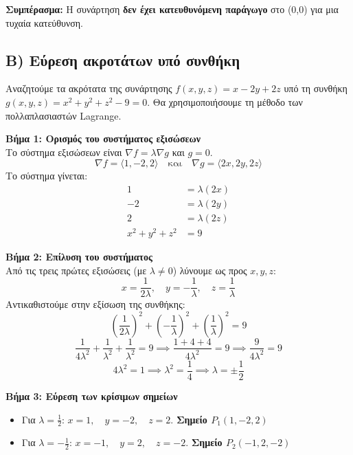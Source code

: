 \documentclass[a4paper,12pt,twoside]{article}
\newcommand{\en}[1]{{\selectlanguage{english}#1\selectlanguage{greek}}}
\begin{document}
\begin{enumerate}[label=\roman*.]
    \noindent
    \textbf{Συμπέρασμα:} Η συνάρτηση \textbf{δεν έχει κατευθυνόμενη παράγωγο} στο (0,0) για μια τυχαία κατεύθυνση.
\end{enumerate}

\hrulefill
\vspace{1em}

\subsection*{B) Εύρεση ακροτάτων υπό συνθήκη}
\noindent
Αναζητούμε τα ακρότατα της συνάρτησης $f(x, y, z) = x - 2y + 2z$ υπό τη συνθήκη $g(x, y, z) = x^2 + y^2 + z^2 - 9 = 0$. Θα χρησιμοποιήσουμε τη μέθοδο των πολλαπλασιαστών \en{Lagrange}.

\noindent
\textbf{Βήμα 1: Ορισμός του συστήματος εξισώσεων}\\
\noindent
Το σύστημα εξισώσεων είναι $\nabla f = \lambda \nabla g$ και $g=0$.
\[
\nabla f = \langle 1, -2, 2 \rangle \quad \text{και} \quad \nabla g = \langle 2x, 2y, 2z \rangle
\]
Το σύστημα γίνεται:
\begin{align*}
1 &= \lambda(2x) \\
-2 &= \lambda(2y) \\
2 &= \lambda(2z) \\
x^2 + y^2 + z^2 &= 9
\end{align*}

\noindent
\textbf{Βήμα 2: Επίλυση του συστήματος}\\
\noindent
Από τις τρεις πρώτες εξισώσεις (με $\lambda \neq 0$) λύνουμε ως προς $x, y, z$:
\[
x = \frac{1}{2\lambda}, \quad y = -\frac{1}{\lambda}, \quad z = \frac{1}{\lambda}
\]
Αντικαθιστούμε στην εξίσωση της συνθήκης:
\[
\left(\frac{1}{2\lambda}\right)^2 + \left(-\frac{1}{\lambda}\right)^2 + \left(\frac{1}{\lambda}\right)^2 = 9
\]
\[
\frac{1}{4\lambda^2} + \frac{1}{\lambda^2} + \frac{1}{\lambda^2} = 9 \implies \frac{1 + 4 + 4}{4\lambda^2} = 9 \implies \frac{9}{4\lambda^2} = 9
\]
\[
4\lambda^2 = 1 \implies \lambda^2 = \frac{1}{4} \implies \lambda = \pm \frac{1}{2}
\]

\noindent
\textbf{Βήμα 3: Εύρεση των κρίσιμων σημείων}
\begin{itemize}
    \item Για $\lambda = \frac{1}{2}$: \quad $x=1, \quad y=-2, \quad z=2$. \quad \textbf{Σημείο $P_1(1, -2, 2)$}
    \item Για $\lambda = -\frac{1}{2}$: \quad $x=-1, \quad y=2, \quad z=-2$. \quad \textbf{Σημείο $P_2(-1, 2, -2)$}
\end{itemize}
\end{document}
